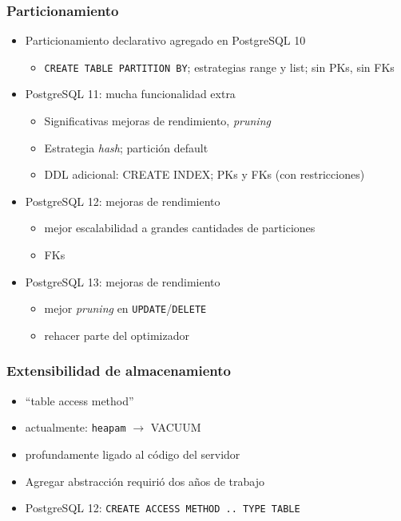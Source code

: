 \begin{frame}
\frametitle{Particionamiento}

\begin{itemize}
\item Particionamiento declarativo agregado en PostgreSQL 10
  \begin{itemize}
  \item \texttt{CREATE TABLE PARTITION BY}; estrategias range y list; sin PKs, sin FKs
  \end{itemize}
\item PostgreSQL 11: mucha funcionalidad extra
  \begin{itemize}
  \item Significativas mejoras de rendimiento,  \textit{pruning}
  \item Estrategia \textit{hash}; partición default
  \item DDL adicional: CREATE INDEX; PKs y FKs (con restricciones)
  \end{itemize}
\item PostgreSQL 12: mejoras de rendimiento
  \begin{itemize}
  \item mejor escalabilidad a grandes cantidades de particiones
  \item FKs
  \end{itemize}
\item PostgreSQL 13: mejoras de rendimiento
 \begin{itemize}
 \item mejor \textit{pruning} en \texttt{UPDATE}/\texttt{DELETE}
 \item rehacer parte del optimizador
 \end{itemize}
\end{itemize}
\end{frame}

\begin{frame}
\frametitle{Extensibilidad de almacenamiento}

\begin{itemize}
\item ``table access method''
\item actualmente: \texttt{heapam} $\rightarrow$ VACUUM
\item profundamente ligado al código del servidor
\item Agregar abstracción requirió dos años de trabajo
\item PostgreSQL 12: \texttt{CREATE ACCESS METHOD .. TYPE TABLE}
\end{itemize}

\end{frame}

